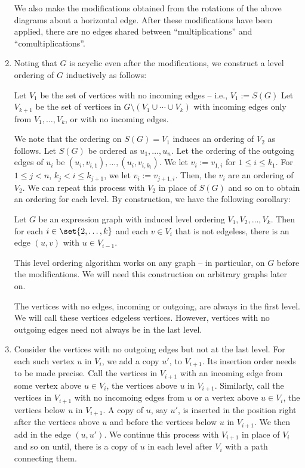 \documentclass[./Thick_TQFTs_and_Quantum_Information.tex]{subfiles}
\begin{document}
\begin{alg}
\begin{enumerate}
We also make the modifications obtained from the rotations of the above diagrams
about a horizontal edge. After these modifications have been applied, there are
no edges shared between ``multiplications'' and ``comultiplications''.

\item Noting that $G$ is acyclic even after the modifications, we construct a
level ordering of $G$ inductively as follows:
\begin{enmrt}
\li Let $V_1$ be the set of vertices with no incoming edges -- i.e.,
$V_1 := S(G)$
\li Let $V_{k + 1}$ be the set of vertices in
$G \setminus (V_1 \cup \cdots \cup V_k)$ with incoming edges only from
$V_1, \dots, V_k$, or with no incoming edges.
\end{enmrt}
We note that the ordering on $S(G) = V_1$ induces an ordering of $V_2$ as
follows. Let $S(G)$ be ordered as $u_1, \dots, u_n$. Let the ordering of the
outgoing edges of $u_i$ be $(u_i, v_{i, 1}), \dots, (u_i, v_{i, k_i})$. We let
$v_i := v_{1, i}$ for $1 \leq i \leq k_1$. For $1 \leq j < n$,
$k_j < i \leq k_{j + 1}$, we let $v_i := v_{j + 1, i}$. Then, the $v_i$ are an
ordering of $V_2$. We can repeat this process with $V_2$ in place of $S(G)$ and
so on to obtain an ordering for each level. By construction, we have the
following corollary:

\begin{cor}\label{cor:lvltolvl}
Let $G$ be an expression graph with induced level ordering
$V_1, V_2, \dots, V_k$. Then for each $i \in \set{2, \dots, k}$ and each
$v \in V_i$ that is not edgeless, there is an edge $(u, v)$ with
$u \in V_{i - 1}$.
\end{cor}

\begin{rmk}
This level ordering algorithm works on any graph -- in particular, on $G$
before the modifications. We will need this construction on arbitrary graphs
later on.
\end{rmk}

\begin{rmk}
The vertices with no edges, incoming or outgoing, are always in the first level.
We will call these vertices edgeless vertices. However, vertices with no
outgoing edges need not always be in the last level.
\end{rmk}

\item\label{alg:edgeless}
Consider the vertices with no outgoing edges but not at the last level. For each
such vertex $u$ in $V_i$, we add a copy $u'$, to $V_{i + 1}$. Its insertion
order needs to be made precise. Call the vertices in $V_{i + 1}$ with an
incoming edge from some vertex above $u \in V_{i}$, the vertices above $u$ in
$V_{i + 1}$. Similarly, call the vertices in $V_{i + 1}$ with no incomoing edges
from $u$ or a vertex above $u \in V_i$, the vertices below $u$ in $V_{i + 1}$.
A copy of $u$, say $u'$, is inserted
in the position right after the vertices above $u$ and before the vertices below
$u$ in $V_{i + 1}$. We then add in the edge $(u, u')$. We continue this process
with $V_{i + 1}$ in place of $V_i$ and so on until, there is a copy
of $u$ in each level after $V_i$ with a path connecting them.


\end{enumerate}
\end{alg}
\end{document}
